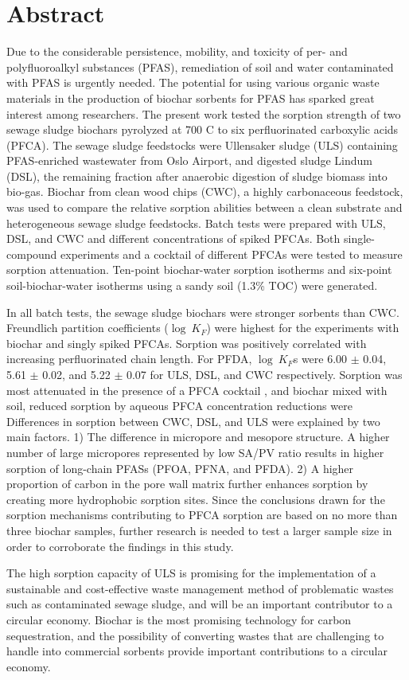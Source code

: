 \newpage
{}
\section*{Abstract}
Due to the considerable persistence, mobility, and toxicity of per- and polyfluoroalkyl substances (PFAS), remediation of soil and water contaminated with PFAS is urgently needed. The potential for using various organic waste materials in the production of biochar sorbents for PFAS has sparked great interest among researchers. The present work tested the sorption strength of two sewage sludge biochars pyrolyzed at 700 \textdegree C to six perfluorinated carboxylic acids (PFCA). The sewage sludge feedstocks were Ullensaker sludge (ULS) containing PFAS-enriched wastewater from Oslo Airport, and digested sludge Lindum (DSL), the remaining fraction after anaerobic digestion of sludge biomass into bio-gas. Biochar from clean wood chips (CWC), a highly carbonaceous feedstock, was used to compare the relative sorption abilities between a clean substrate and heterogeneous sewage sludge feedstocks. Batch tests were prepared with ULS, DSL, and CWC and different concentrations of spiked PFCAs. Both single-compound experiments and a cocktail of different PFCAs were tested to measure sorption attenuation. Ten-point biochar-water sorption isotherms and six-point soil-biochar-water isotherms using a sandy soil (1.3\% TOC) were generated. 

In all batch tests, the sewage sludge biochars were stronger sorbents than CWC. Freundlich partition coefficients ($\log~K_F$) were highest for the experiments with biochar and singly spiked PFCAs. Sorption was positively correlated with increasing perfluorinated chain length. For PFDA, $\log~K_F$s were 6.00 $\pm$ 0.04, 5.61 $\pm$ 0.02, and 5.22 $\pm$ 0.07 for ULS, DSL, and CWC respectively. Sorption was most attenuated in the presence of a PFCA cocktail , and biochar mixed with soil, reduced sorption by  aqueous PFCA concentration reductions were  Differences in sorption between CWC, DSL, and ULS were explained by two main factors. 1) The difference in micropore and mesopore structure. A higher number of large micropores represented by low SA/PV ratio results in higher sorption of long-chain PFASs (PFOA, PFNA, and PFDA). 2) A higher proportion of carbon in the pore wall matrix further enhances sorption by creating more hydrophobic sorption sites. Since the conclusions drawn for the sorption mechanisms contributing to PFCA sorption are based on no more than three biochar samples, further research is needed to test a larger sample size in order to corroborate the findings in this study.

The high sorption capacity of ULS is promising for the implementation of a sustainable and cost-effective waste management method of problematic wastes such as contaminated sewage sludge, and will be an important contributor to a circular economy. Biochar is the most promising technology for carbon sequestration, and the possibility of converting wastes that are challenging to handle into commercial sorbents provide important contributions to a circular economy.